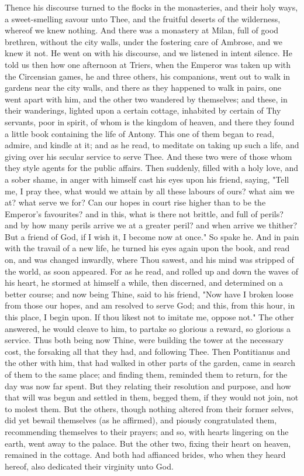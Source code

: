 \documentclass[b5paper,openright,12pt,twoside]{book}
\begin{document}
Thence his discourse turned to the flocks in the monasteries, and their
holy ways, a sweet-smelling savour unto Thee, and the fruitful deserts
of the wilderness, whereof we knew nothing. And there was a monastery
at Milan, full of good brethren, without the city walls, under the
fostering care of Ambrose, and we knew it not. He went on with his
discourse, and we listened in intent silence. He told us then how one
afternoon at Triers, when the Emperor was taken up with the Circensian
games, he and three others, his companions, went out to walk in gardens
near the city walls, and there as they happened to walk in pairs, one
went apart with him, and the other two wandered by themselves; and
these, in their wanderings, lighted upon a certain cottage, inhabited
by certain of Thy servants, poor in spirit, of whom is the kingdom
of heaven, and there they found a little book containing the life of
Antony. This one of them began to read, admire, and kindle at it; and
as he read, to meditate on taking up such a life, and giving over his
secular service to serve Thee. And these two were of those whom they
style agents for the public affairs. Then suddenly, filled with a holy
love, and a sober shame, in anger with himself cast his eyes upon his
friend, saying, "Tell me, I pray thee, what would we attain by all these
labours of ours? what aim we at? what serve we for? Can our hopes in
court rise higher than to be the Emperor's favourites? and in this, what
is there not brittle, and full of perils? and by how many perils arrive
we at a greater peril? and when arrive we thither? But a friend of God,
if I wish it, I become now at once." So spake he. And in pain with the
travail of a new life, he turned his eyes again upon the book, and
read on, and was changed inwardly, where Thou sawest, and his mind was
stripped of the world, as soon appeared. For as he read, and rolled up
and down the waves of his heart, he stormed at himself a while, then
discerned, and determined on a better course; and now being Thine, said
to his friend, "Now have I broken loose from those our hopes, and am
resolved to serve God; and this, from this hour, in this place, I begin
upon. If thou likest not to imitate me, oppose not." The other answered,
he would cleave to him, to partake so glorious a reward, so glorious
a service. Thus both being now Thine, were building the tower at the
necessary cost, the forsaking all that they had, and following Thee.
Then Pontitianus and the other with him, that had walked in other parts
of the garden, came in search of them to the same place; and finding
them, reminded them to return, for the day was now far spent. But they
relating their resolution and purpose, and how that will was begun and
settled in them, begged them, if they would not join, not to molest
them. But the others, though nothing altered from their former selves,
did yet bewail themselves (as he affirmed), and piously congratulated
them, recommending themselves to their prayers; and so, with hearts
lingering on the earth, went away to the palace. But the other two,
fixing their heart on heaven, remained in the cottage. And both had
affianced brides, who when they heard hereof, also dedicated their
virginity unto God.
\end{document}
